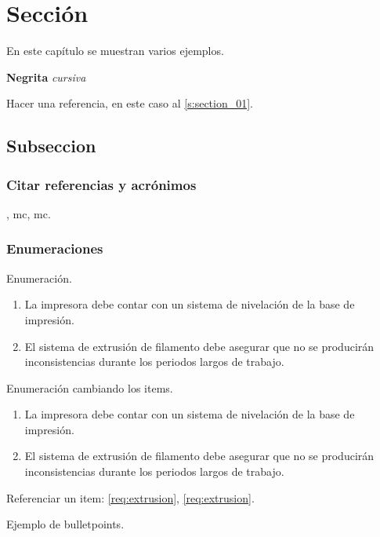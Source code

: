 \section{Sección} \label{s:section_01}

En este capítulo se muestran varios ejemplos.

\textbf{Negrita} \textit{cursiva}

Hacer una referencia, en este caso al \autoref{s:section_01}.



\subsection{Subseccion}

\subsubsection{Citar referencias y acrónimos}

\cite{im78552}, \acrshort{mc}, \acrfull{mc}.

\subsubsection{Enumeraciones}

Enumeración.

\begin{enumerate}
	\item La impresora debe contar con un sistema de nivelación de la base de impresión.
	\item El sistema de extrusión de filamento debe asegurar que no se producirán inconsistencias durante los periodos largos de trabajo.
\end{enumerate}

Enumeración cambiando los items.

\begin{enumerate}[label= \textbf{R-\arabic*}]
	\item La impresora debe contar con un sistema de nivelación de la base de impresión.
	\item El sistema de extrusión de filamento debe asegurar que no se producirán inconsistencias durante los periodos largos de trabajo. \label{req:extrusion}
\end{enumerate}

Referenciar un item: \ref{req:extrusion}, \autoref{req:extrusion}.


Ejemplo de bulletpoints.


